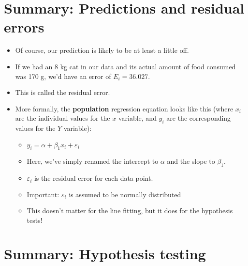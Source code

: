 \documentclass[]{article}
\providecommand{\tightlist}{%
  \setlength{\itemsep}{0pt}\setlength{\parskip}{0pt}}
\begin{document}
\section{Summary: Predictions and residual
errors}\label{summary-predictions-and-residual-errors}

\begin{itemize}
\tightlist
\item
  Of course, our prediction is likely to be at least a little off.
\item
  If we had an 8 kg cat in our data and its actual amount of food
  consumed was 170 g, we'd have an error of \(E_i = 36.027\).
\item
  This is called the residual error.
\item
  More formally, the \textbf{population} regression equation looks like
  this (where \(x_i\) are the individual values for the \(x\) variable,
  and \(y_i\) are the corresponding values for the \(Y\) variable):

  \begin{itemize}
  \tightlist
  \item
    \(y_i = \alpha + \beta_1 x_i + \varepsilon_i\)
  \item
    Here, we've simply renamed the intercept to \(\alpha\) and the slope
    to \(\beta_1\).
  \item
    \(\varepsilon_i\) is the residual error for each data point.
  \item
    Important: \(\varepsilon_i\) is assumed to be normally distributed
  \item
    This doesn't matter for the line fitting, but it does for the
    hypothesis tests!
  \end{itemize}
\end{itemize}

\section{Summary: Hypothesis testing}\label{summary-hypothesis-testing}
\end{document}
